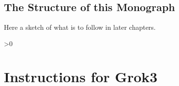 \documentclass[10pt,titlepage]{book}
\newcommand{\ignore}[1]{}
\newcommand{\resetnotes}{%
  \ifnum\value{endnote}>0%
  \theendnotes%
  \setcounter{endnote}{0}%
  \else%
  \fi%
}
\begin{document}
\section{The Structure of this Monograph}

Here a sketch of what is to follow in later chapters.


\cite{couturat1901logique}


\resetnotes

\ignore{
\chapter{A Philosophical Kernel}\label{PK}

%
\resetnotes

\chapter{Evolution}

\cite{donald1991,murray2017evolution}

\chapter{Synthetic Epistemology and Foundational Abstract Semantics}


\resetnotes

\chapter{The Evolution of Declarative Knowledge}\label{EDK}

%
\resetnotes


\chapter{The Fundamental Triple Trichotomy}\label{FTT}

%
\resetnotes
}%

\appendix

\ignore{
\chapter{The Philosophy of Rudolf Carnap}\label{PRC}


\resetnotes

}%

\appendix

\chapter{Instructions for Grok3}\label{InstructionsForGrok}
\end{document}
